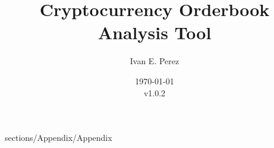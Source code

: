 \documentclass[refman]{article}
\title{Cryptocurrency Orderbook Analysis Tool}
\author{Ivan E. Perez}
\date{\today\\v1.0.2}
\begin{document}
 
\maketitle
{} 
\tableofcontents 

\pagestyle{headings} 
















 {sections/Appendix/Appendix}




\end{document}
